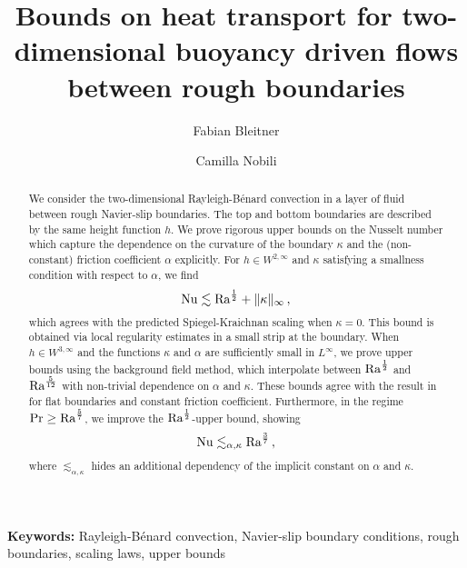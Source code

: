\documentclass{article}
\title{Bounds on heat transport for two-dimensional buoyancy driven flows between rough boundaries}
\author[1]{Fabian Bleitner}
\author[2]{Camilla Nobili}
\affil[1]{\small{Department of Mathematics, University of Hamburg, Germany}}
\affil[2]{\small{Department of Mathematics, University of Surrey, United Kingdom}}
\date{}
\theoremstyle{definition}
\theoremstyle{definition}
\newcommand{\Ra}{{\rm{Ra}}}
\newcommand{\Nu}{{\rm{Nu}}}
\providecommand{\keywords}[1]
{
  \noindent\small	
  \textbf{Keywords:} #1
}
\begin{document}
\maketitle

\begin{abstract}
We consider the two-dimensional Rayleigh-B\'enard convection in a layer of fluid between rough Navier-slip boundaries.
The top and bottom boundaries are described by the same height function $h$.
We prove rigorous upper bounds on the Nusselt number which capture the dependence on the curvature of the boundary $\kappa$ and the (non-constant) friction coefficient $\alpha$ explicitly.
For $h\in W^{2,\infty}$ and $\kappa$ satisfying a smallness condition with respect to $\alpha$, we find 
\begin{equation*}
 \Nu\lesssim \Ra^{\frac 12}+\|\kappa\|_{\infty}\,,
\end{equation*}
which agrees with the predicted Spiegel-Kraichnan scaling when $\kappa=0$.
This bound is obtained via local regularity estimates in a small strip at the boundary.
When $h\in W^{3,\infty}$ and the functions $\kappa$ and $\alpha$ are sufficiently small in $L^{\infty}$, we prove upper bounds using the background field method, which interpolate between $\Ra^{\frac 12}$ and $\Ra^{\frac{5}{12}}$ with non-trivial dependence on $\alpha$ and $\kappa$.
These bounds agree with the result in \cite{drivasNguyenNobiliBoundsOnHeatFluxForRayleighBenardConvectionBetweenNavierSlipFixedTemperatureBoundaries} for flat boundaries and constant friction coefficient.
Furthermore, in the regime $\Pr\geq \Ra^{\frac 57}$, we improve the $\Ra^{\frac 12}$-upper bound, showing
$$\Nu\lesssim_{\alpha,\kappa}\Ra^{\frac 37}\,,$$
where $\lesssim_{\alpha,\kappa}$ hides an additional dependency of the implicit constant on $\alpha$ and $\kappa$. 
\end{abstract}

\keywords{Rayleigh-B\'enard convection, Navier-slip boundary conditions, rough boundaries, scaling laws, upper bounds}


\end{document}
